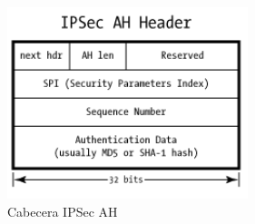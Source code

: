 \documentclass[a4paper,10pt]{article}
\begin{document}
	\begin{figure}[!htb]
		\centering
		\includegraphics[width=7cm]{Imagenes/cabeceraIPSecAH.png}
		\caption{Cabecera IPSec AH} \label{img003}
	\end{figure}
	
	
	
	\newpage
\end{document}
